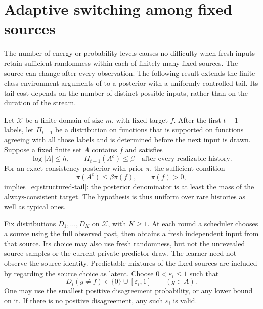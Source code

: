 \section{Adaptive switching among fixed sources}
\label{sec:structured}

The number of energy or probability levels causes no difficulty when
fresh inputs retain sufficient randomness within each of finitely many
fixed sources. The source can change after every observation. The
following result extends the finite-class environment arguments of
\cite{occam} to a posterior with a uniformly controlled tail. Its tail
cost depends on the number of distinct possible inputs, rather than on
the duration of the stream.

Let $\mathcal X$ be a finite domain of size $m$, with fixed target $f$.
After the first $t-1$ labels, let $\Pi_{t-1}$ be a distribution on functions
that is supported on functions agreeing with all those labels and is
determined before the next input is drawn. Suppose a fixed finite set
$A$ contains $f$ and satisfies
\begin{equation}\label{eq:structured-tail}
 \log|A|\le h,\qquad \Pi_{t-1}(A^c)\le\beta
 \quad\text{after every realizable history}.
\end{equation}
For an exact consistency posterior with prior $\pi$, the sufficient
condition
\begin{equation}\label{eq:structured-prior-ratio}
 \pi(A^c)\le\beta\pi(f),\qquad \pi(f)>0,
\end{equation}
implies~\eqref{eq:structured-tail}: the posterior denominator is at least
the mass of the always-consistent target. The hypothesis is thus uniform
over rare histories as well as typical ones.

Fix distributions $D_1,\ldots,D_K$ on $\mathcal X$, with $K\ge1$.
At each round a scheduler chooses a source using the full observed past,
then obtains a fresh independent input from that source. Its choice may
also use fresh randomness, but not the unrevealed source samples or the
current private predictor draw. The learner need not observe the source
identity. Predictable mixtures of the fixed sources are included by
regarding the source choice as latent. Choose $0<\varepsilon_i\le1$ such
that
\begin{equation}\label{eq:structured-gap}
 D_i(g\ne f)\in\{0\}\cup[\varepsilon_i,1]
 \qquad(g\in A).
\end{equation}
One may use the smallest positive disagreement probability, or any lower
bound on it. If there is no positive disagreement, any such
$\varepsilon_i$ is valid.

